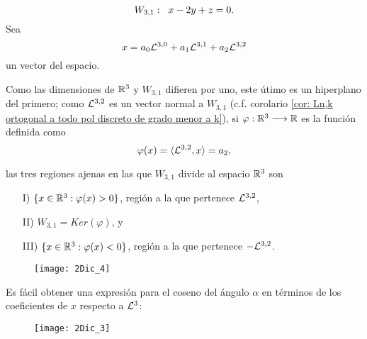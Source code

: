 {\[
W_{3,1}: \hspace{0.2cm} x-2y+z=0.
\]
Sea 
\begin{equation*}
\label{eq0: 9Feb}
x=a_{0}\mathcal{L}^{3,0}+a_{1}\mathcal{L}^{3,1}+a_{2}\mathcal{L}^{3,2}
\end{equation*}
un vector del espacio.


Como las dimensiones de $\mathbb{R}^{3}$ y $W_{3,1}$ 
difieren por uno,
este útimo es un hiperplano
del primero; como $\mathcal{L}^{3,2}$
es un vector normal a $W_{3,1}$
(c.f. corolario \ref{cor: Ln,k ortogonal a todo pol discreto de grado menor a k}), 
si $\varphi: \mathbb{R}^{3} \longrightarrow \mathbb{R}$ es la función
definida como
\begin{equation}
\label{eq: funcion phi ejemplo}
\varphi(x)= \langle \mathcal{L}^{3,2} , x \rangle =a_{2},
\end{equation}



las tres regiones ajenas en las
que $W_{3,1}$ divide al espacio
$\mathbb{R}^{3}$ son 


\begin{itemize}
\item[I)] $\{ x \in \mathbb{R}^{3} : \varphi(x)>0 \}$,
región a la que pertenece $\mathcal{L}^{3,2}$,
\item[II)] $W_{3,1}= Ker(\varphi)$, y 
\item[III)] $\{ x \in \mathbb{R}^{3} : \varphi(x)<0 \}$,
región a la que pertenece $-\mathcal{L}^{3,2}$.
\end{itemize}

\begin{figure}[H]
	\centering
	\texttt{[image: 2Dic\_4]} 
\end{figure}

Es fácil obtener una expresión para el coseno del ángulo
$\alpha$ en términos de los coeficientes de $x$ respecto a $\mathcal{L}^{3}$:

\begin{figure}[H]
	\centering
	\texttt{[image: 2Dic\_3]}
\end{figure}


}
